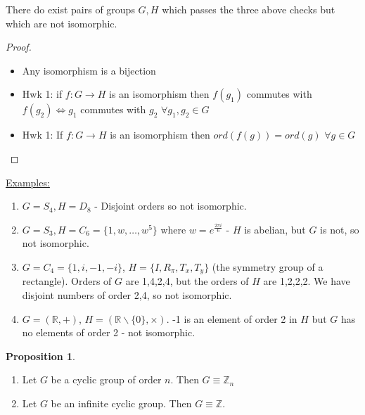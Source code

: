 \documentclass{article}
\theoremstyle{definition}
\newtheorem{proposition}{Proposition}
\begin{document}
There do exist pairs of groups $G, H$ which passes the three above checks but which are not isomorphic.

\begin{proof}
  \begin{itemize}
    \item Any isomorphism is a bijection
    \item Hwk 1: 
      if $f : G \rightarrow H$ is an isomorphism then $f(g_1)$ commutes with $f(g_2) \iff g_1$ commutes with $g_2$ $\forall g_1,g_2 \in G$
    \item Hwk 1: 
      If $f:G\rightarrow H$ is an isomorphism then $ord(f(g))=ord(g)$ $\forall g\in G$
  \end{itemize}
\end{proof}

\underline{Examples:}
\begin{enumerate}
  \item $G=S_4, H=D_8$ - Disjoint orders so not isomorphic.
  \item $G=S_3, H=C_6=\{1,w,\ldots,w^5\}$ where $w=e^{\frac{2 \pi i}{6}}$ - $H$ is abelian, but $G$ is not, so not isomorphic.
  \item $G=C_4=\{1,i,-1,-i\}$, $H=\{I,R_\pi,T_x,T_y\}$ (the symmetry group of a rectangle). Orders of $G$ are 1,4,2,4, but the orders of $H$ are 1,2,2,2. We have disjoint numbers of order 2,4, so not isomorphic.
  \item $G=(\mathbb{R}, +)$, $H=(\mathbb{R}\backslash\{0\}, \times).$ -1 is an element of order 2 in $H$ but $G$ has no elements of order 2 - not isomorphic.
\end{enumerate}

\begin{proposition}
  \begin{enumerate}
    \item Let $G$ be a cyclic group of order $n$. Then $G \equiv \mathbb{Z}_n$
    \item Let $G$ be an infinite cyclic group. Then $G \equiv \mathbb{Z}$.
  \end{enumerate}
\end{proposition}
\end{document}
